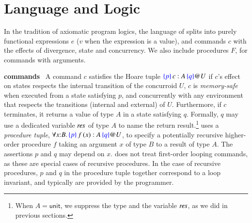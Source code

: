 \section{Language and Logic}
\label{sec:logic}

In the tradition of axiomatic program logics, the language of \SCST
splits into purely functional expressions $e$ ($v$ when the expression
is a value), and commands $c$ with the effects of divergence, state and
concurrency. We also include procedures $F$, for commands with
arguments.

\vspace{5pt}

\noindent\textbf{\SCST commands}~
%
A command $c$ satisfies the Hoare tuple $\textcolor{blue}{\left\{ p \right\}}\, c : A \, \textcolor{blue}{\left\{ q \right\}}@{U}$ if
$c$'s effect on states respects the internal transition of the
concurroid $U$, $c$ is \emph{memory-safe} when executed from a state
satisfying $p$, and concurrently with any environment that respects
the transitions (internal and external) of $U$. Furthermore, if $c$
terminates, it returns a value of type $A$ in a state satisfying
$q$. Formally, $q$ may use a dedicated variable $\mathit{res}$ of type $A$
to name the return result.\footnote{When $A = \mathsf{unit}$, we
  suppress the type and the variable $\mathit{res}$, as we did in previous
  sections.}
%
\SCST uses a {\em procedure tuple},
$\forall{x}{:}{B}\mathord{.}\,\textcolor{blue}{\left\{ p \right\}}\, f\,(x) : A \, \textcolor{blue}{\left\{ q \right\}}@{U}$, to specify a
potentially recursive higher-order procedure $f$ taking an argument
$x$ of type $B$ to a result of type $A$. The assertions $p$ and $q$
may depend on $x$. \SCST does not treat first-order looping commands,
as these are special cases of recursive procedures. In the case of
recursive procedures, $p$ and $q$ in the procedure tuple together
correspond to a loop invariant, and typically are provided by the
programmer.


